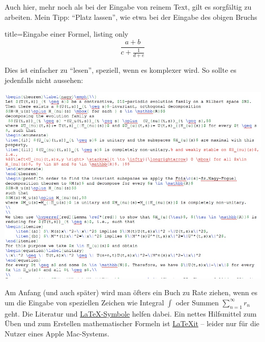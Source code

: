 Auch hier, mehr noch als bei der Eingabe von reinem Text, gilt es sorgfältig zu arbeiten. 
Mein Tipp: \enquote{Platz lassen}, wie etwa bei der Eingabe des obigen Bruchs
%
	\begin{tcblisting}{title=Eingabe einer Formel, listing only}
		\[
			\frac{a+b}{c + \frac{1}{d+e}}
		\]
	\end{tcblisting}
%
Dies ist einfacher zu \enquote{lesen}, speziell, wenn es komplexer wird.
So sollte es jedenfalls nicht aussehen:
%
\begin{center}
	\includegraphics[scale=0.4]{./content/example2}
\end{center}
%
Am Anfang (und auch später) wird man öfters ein Buch zu Rate ziehen, wenn es um die Eingabe von speziellen Zeichen wie Integral $ \int $ oder Summen $ \sum_{ n = 1 }^{ \infty } r_{ n } $ geht.
Die Literatur und \href{http://tug.ctan.org/info/symbols/comprehensive/symbols-a4.pdf}{\LaTeX{}-Symbole} \cite{comprehensive} helfen dabei.
Ein nettes Hilfsmittel zum Üben und zum Erstellen mathematischer Formeln ist \href{https://www.chachatelier.fr/latexit/}{LaTeXit} -- leider nur für die Nutzer eines Apple Mac-Systems.

